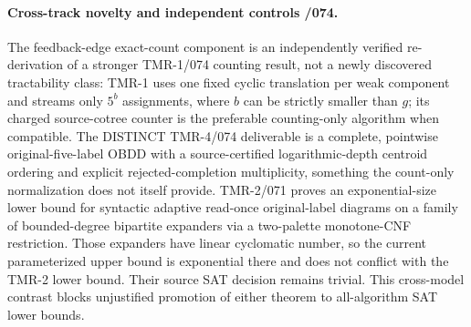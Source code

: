\documentclass[11pt]{article}
\begin{document}
\paragraph{Cross-track novelty and independent controls /074.}
The feedback-edge exact-count component is an independently verified
re-derivation of a stronger TMR-1/074 counting result, not a newly
discovered tractability class: TMR-1 uses one fixed cyclic
translation per weak component and streams only $5^b$ assignments,
where $b$ can be strictly smaller than $g$; its charged
source-cotree counter is the preferable counting-only algorithm
when compatible. The DISTINCT TMR-4/074 deliverable is a complete,
pointwise original-five-label OBDD with a source-certified
logarithmic-depth centroid ordering and explicit rejected-completion
multiplicity, something the count-only normalization does not itself
provide. TMR-2/071 proves an exponential-size lower bound for
syntactic adaptive read-once original-label diagrams on a family of
bounded-degree bipartite expanders via a two-palette monotone-CNF
restriction. Those expanders have linear cyclomatic number, so the
current parameterized upper bound is exponential there and
does not conflict with the TMR-2 lower bound. Their source SAT
decision remains trivial. This cross-model contrast blocks
unjustified promotion of either theorem to all-algorithm SAT
lower bounds.
\end{document}
